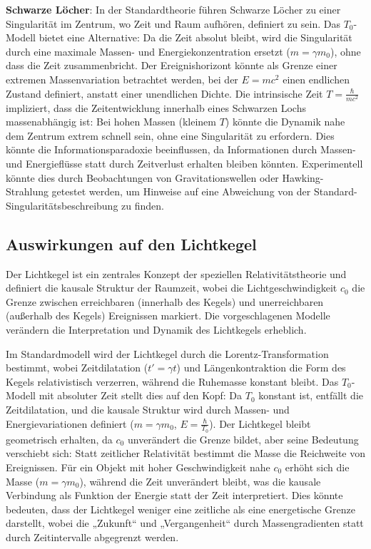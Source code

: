 \documentclass[a4paper,12pt]{article}
\begin{document}
	\textbf{Schwarze Löcher}: In der Standardtheorie führen Schwarze Löcher zu einer Singularität im Zentrum, wo Zeit und Raum aufhören, definiert zu sein. Das \( T_0 \)-Modell bietet eine Alternative: Da die Zeit absolut bleibt, wird die Singularität durch eine maximale Massen- und Energiekonzentration ersetzt (\( m = \gamma m_0 \)), ohne dass die Zeit zusammenbricht. Der Ereignishorizont könnte als Grenze einer extremen Massenvariation betrachtet werden, bei der \( E = m c^2 \) einen endlichen Zustand definiert, anstatt einer unendlichen Dichte. Die intrinsische Zeit \( T = \frac{\hbar}{m c^2} \) impliziert, dass die Zeitentwicklung innerhalb eines Schwarzen Lochs massenabhängig ist: Bei hohen Massen (kleinem \( T \)) könnte die Dynamik nahe dem Zentrum extrem schnell sein, ohne eine Singularität zu erfordern. Dies könnte die Informationsparadoxie beeinflussen, da Informationen durch Massen- und Energieflüsse statt durch Zeitverlust erhalten bleiben könnten. Experimentell könnte dies durch Beobachtungen von Gravitationswellen oder Hawking-Strahlung getestet werden, um Hinweise auf eine Abweichung von der Standard-Singularitätsbeschreibung zu finden.
	
	\subsection{Auswirkungen auf den Lichtkegel}
	Der Lichtkegel ist ein zentrales Konzept der speziellen Relativitätstheorie und definiert die kausale Struktur der Raumzeit, wobei die Lichtgeschwindigkeit \( c_0 \) die Grenze zwischen erreichbaren (innerhalb des Kegels) und unerreichbaren (außerhalb des Kegels) Ereignissen markiert. Die vorgeschlagenen Modelle verändern die Interpretation und Dynamik des Lichtkegels erheblich.
	
	Im Standardmodell wird der Lichtkegel durch die Lorentz-Transformation bestimmt, wobei Zeitdilatation (\( t' = \gamma t \)) und Längenkontraktion die Form des Kegels relativistisch verzerren, während die Ruhemasse konstant bleibt. Das \( T_0 \)-Modell mit absoluter Zeit stellt dies auf den Kopf: Da \( T_0 \) konstant ist, entfällt die Zeitdilatation, und die kausale Struktur wird durch Massen- und Energievariationen definiert (\( m = \gamma m_0 \), \( E = \frac{\hbar}{T_0} \)). Der Lichtkegel bleibt geometrisch erhalten, da \( c_0 \) unverändert die Grenze bildet, aber seine Bedeutung verschiebt sich: Statt zeitlicher Relativität bestimmt die Masse die Reichweite von Ereignissen. Für ein Objekt mit hoher Geschwindigkeit nahe \( c_0 \) erhöht sich die Masse (\( m = \gamma m_0 \)), während die Zeit unverändert bleibt, was die kausale Verbindung als Funktion der Energie statt der Zeit interpretiert. Dies könnte bedeuten, dass der Lichtkegel weniger eine zeitliche als eine energetische Grenze darstellt, wobei die „Zukunft“ und „Vergangenheit“ durch Massengradienten statt durch Zeitintervalle abgegrenzt werden.
	
\end{document}

